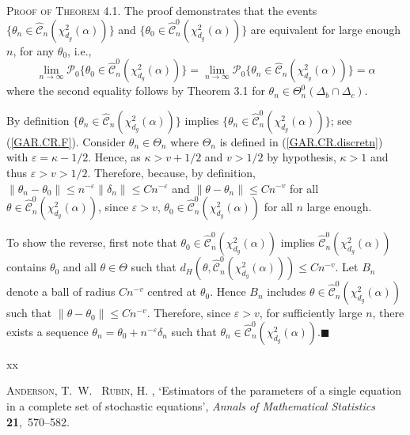 \documentclass[hidelinks, 11 pt, a4paper, pdflatex]{article}
\begin{document}
{  \textsc{Proof of Theorem 4.1}. The proof demonstrates that the events $\{\theta_{n} \in
   \hat{\mathcal{C}}_{n}(\chi_{d_{g}}^{2}(\alpha))\}$ and $\{\theta_{0} \in \hat{\mathcal{C}}_{n}^0(\chi_{d_{g}}^{2}(\alpha))\}$
   are equivalent for large enough $n$, for any $\theta_{0}$, i.e.,
    \[
     \lim_{n \rightarrow \infty}\mathcal{P}_{0} \{\theta _{0} \in \hat{\mathcal{C}}_{n}^0(\chi_{d_{g}}^{2}(\alpha))\} = \lim_{n \rightarrow \infty}\mathcal{P}_{0}\{\theta_{n} \in \hat{\mathcal{C}}_{n}(\chi_{d_{g}}^{2}(\alpha))\} = \alpha
    \]
   where the second equality follows by Theorem 3.1 for $\theta_{n} \in \Theta_{n}^{0}(\Delta_{b} \cap \Delta_{c})$.

   By definition $\{\theta_{n} \in \hat{\mathcal{C}}_{n}(\chi_{d_{g}}^{2}(\alpha))\}$ implies $\{\theta_{n} \in \hat{\mathcal{C}}_{n}^0(\chi_{d_{g}}^{2}(\alpha))\}$; see (\ref{GAR.CR.F}). Consider $\theta_{n} \in \Theta_{n}$ where $\Theta_{n}$ is defined in (\ref{GAR.CR.discretn}) with $\varepsilon = \kappa - 1/2$. Hence, as $\kappa > v+1/2$ and $v > 1/2$ by hypothesis, $\kappa > 1$ and thus $\varepsilon > v >1/2$. Therefore, because, by definition, $\|\theta_{n} - \theta_{0}\| \leq n^{-\varepsilon}\|\delta_{n}\| \leq Cn^{-\varepsilon}$ and $\|\theta - \theta_{n}\| \leq Cn^{-v}$ for all $\theta \in \hat{\mathcal{C}}_{n}^0(\chi_{d_{g}}^{2}(\alpha))$, since $\varepsilon > v$, $\theta_{0} \in \hat{\mathcal{C}}_{n}^0(\chi_{d_{g}}^{2}(\alpha))$ for all $n$ large enough.

   To show the reverse, first note that $\theta_{0} \in \hat{\mathcal{C}}_{n}^0(\chi_{d_{g}}^{2}(\alpha))$ implies $\hat{\mathcal{C}}_{n}^0(\chi_{d_{g}}^{2}(\alpha))$ contains $\theta_{0}$ and all $\theta \in \Theta$ such that $d_{H}(\theta,\hat{\mathcal{C}}_{n}^0(\chi_{d_{g}}^{2}(\alpha))) \leq Cn^{-v}$. Let $B_{n}$ denote a ball of radius $Cn^{-v}$ centred at $\theta_{0}$. Hence $B_{n}$ includes $\theta \in \hat{\mathcal{C}}_{n}^0(\chi_{d_{g}}^{2}(\alpha))$ such that $\|\theta - \theta_{0}\| \leq Cn^{-v}$. Therefore, since $\varepsilon > v$, for sufficiently large $n$, there exists a sequence $\theta_{n} = \theta_{0} + n^{-\varepsilon}\delta_{n}$ such that $\theta_{n} \in \hat{\mathcal{C}}_{n}^0(\chi_{d_{g}}^{2}(\alpha))$.$\blacksquare$



 \begin{thebibliography}{xx}

  \textsc{Anderson, T.~W. \harvardand\ Rubin, H.}  \harvardyearright,
   `Estimators of the parameters of a single equation in a complete set of stochastic equations',
   {\em Annals of Mathematical Statistics} {\bf 21},~570--582.


\end{thebibliography}}
\end{document}
